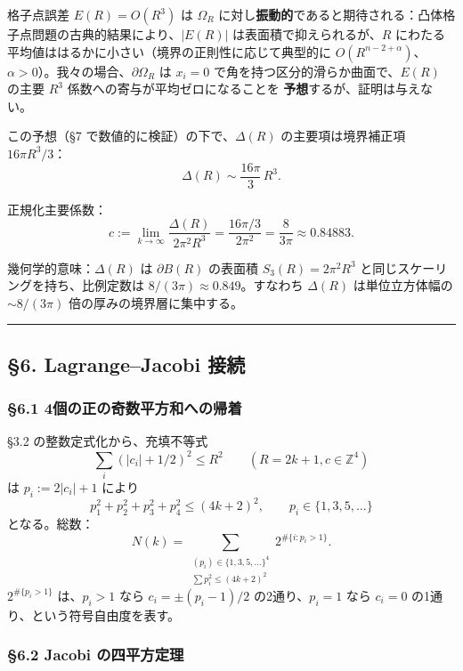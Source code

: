\documentclass[a4paper,11pt]{ltjsarticle}
\theoremstyle{definition}
\begin{document}
格子点誤差 \(E(R) = O(R^3)\) は \(\Omega_R\)
に対し\textbf{振動的}であると期待される：凸体格子点問題の古典的結果により、\(|E(R)|\)
は表面積で抑えられるが、\(R\)
にわたる平均値ははるかに小さい（境界の正則性に応じて典型的に
\(O(R^{n-2+\alpha})\)、\(\alpha > 0\)）。我々の場合、\(\partial \Omega_R\)
は \(x_i = 0\) で角を持つ区分的滑らか曲面で、\(E(R)\) の主要 \(R^3\)
係数への寄与が平均ゼロになることを \textbf{予想}するが、証明は与えない。

この予想（§7 で数値的に検証）の下で、\(\Delta(R)\) の主要項は境界補正項
\(16\pi R^3/3\)： \[\Delta(R) \sim \frac{16\pi}{3}\, R^3.\]

正規化主要係数：
\[\boxed{\;c := \lim_{k \to \infty} \frac{\Delta(R)}{2\pi^2 R^3} = \frac{16\pi/3}{2\pi^2} = \frac{8}{3\pi} \approx 0.84883.\;}\]

幾何学的意味：\(\Delta(R)\) は \(\partial B(R)\) の表面積
\(S_3(R) = 2\pi^2 R^3\) と同じスケーリングを持ち、比例定数は
\(8/(3\pi) \approx 0.849\)。すなわち \(\Delta(R)\) は単位立方体幅の
\(\sim 8/(3\pi)\) 倍の厚みの境界層に集中する。

\begin{center}\rule{0.5\linewidth}{0.5pt}\end{center}

\subsection{§6. Lagrange--Jacobi
接続}\label{lagrangejacobi-ux63a5ux7d9a}

\subsubsection{§6.1
4個の正の奇数平方和への帰着}\label{ux500bux306eux6b63ux306eux5947ux6570ux5e73ux65b9ux548cux3078ux306eux5e30ux7740}

§3.2 の整数定式化から、充填不等式
\[\sum_i (|c_i| + 1/2)^2 \le R^2 \qquad (R = 2k+1, c \in \mathbb{Z}^4)\]
は \(p_i := 2|c_i| + 1\) により
\[p_1^2 + p_2^2 + p_3^2 + p_4^2 \le (4k+2)^2, \qquad p_i \in \{1, 3, 5, \ldots\}\]
となる。総数：
\[N(k) = \sum_{\substack{(p_i) \in \{1,3,5,\ldots\}^4 \\ \sum p_i^2 \le (4k+2)^2}} 2^{\#\{i : p_i > 1\}}.\]
\(2^{\#\{p_i > 1\}}\) は、\(p_i > 1\) なら \(c_i = \pm (p_i-1)/2\)
の2通り、\(p_i = 1\) なら \(c_i = 0\) の1通り、という符号自由度を表す。

\subsubsection{§6.2 Jacobi
の四平方定理}\label{jacobi-ux306eux56dbux5e73ux65b9ux5b9aux7406}
\end{document}
